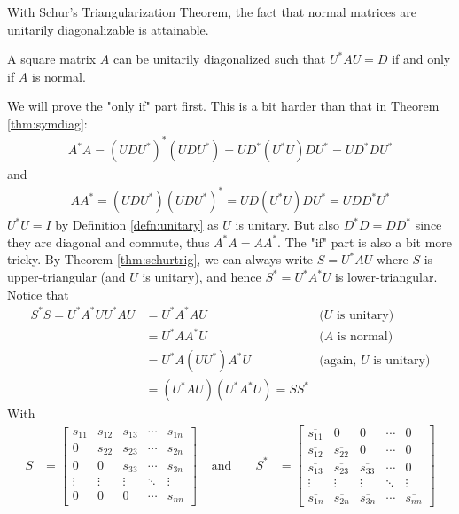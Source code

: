 With Schur's Triangularization Theorem, the fact that normal matrices are unitarily diagonalizable is attainable.
\begin{thm}
\label{thm:normalunidiag}
A square matrix $A$ can be unitarily diagonalized such that $U^*AU = D$ if and only if $A$ is normal.
\end{thm}
We will prove the "only if" part first. This is a bit harder than that in Theorem \ref{thm:symdiag}:
\begin{align*}
A^*A = (UDU^*)^*(UDU^*) = UD^*(U^*U) DU^* = UD^*DU^* 
\end{align*}
and
\begin{align*}
AA^* = (UDU^*)(UDU^*)^* = UD(U^*U) DU^* = UDD^*U^*  
\end{align*}
$U^*U = I$ by Definition \ref{defn:unitary} as $U$ is unitary. But also $D^*D = DD^*$ since they are diagonal and commute, thus $A^*A = AA^*$. The "if" part is also a bit more tricky. By Theorem \ref{thm:schurtrig}, we can always write $S = U^*AU$ where $S$ is upper-triangular (and $U$ is unitary), and hence $S^* = U^*A^*U$ is lower-triangular. Notice that
\begin{align*}
S^*S = U^*A^*U U^*AU &= U^*A^* AU &\text{($U$ is unitary)} \\
&= U^*AA^*U &\text{($A$ is normal)} \\
&= U^*A(UU^*)A^*U &\text{(again, $U$ is unitary)} \\
&= (U^*AU) (U^*A^*U) = SS^*
\end{align*}
With
\begin{align*}
S &= 
\begin{bmatrix}
s_{11} & s_{12} & s_{13} & \cdots & s_{1n} \\
0 & s_{22} & s_{23} & \cdots & s_{2n} \\
0 & 0 & s_{33} & \cdots & s_{3n} \\
\vdots & \vdots & \vdots & \ddots & \vdots \\
0 & 0 & 0 & \cdots & s_{nn}
\end{bmatrix}
& \text{ and } & &
S^* &= 
\begin{bmatrix}
\overline{s_{11}} & 0 & 0 & \cdots & 0 \\
\overline{s_{12}} & \overline{s_{22}} & 0 & \cdots & 0 \\
\overline{s_{13}} & \overline{s_{23}} & \overline{s_{33}} & \cdots & 0 \\
\vdots & \vdots & \vdots & \ddots & \vdots \\
\overline{s_{1n}} & \overline{s_{2n}} & \overline{s_{3n}} & \cdots & \overline{s_{nn}}
\end{bmatrix}
\end{align*}
